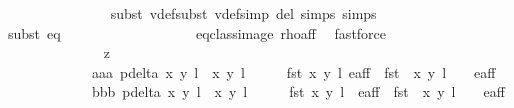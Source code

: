 \begin{isabellebody}
\ \ \ \ \ \ \ \ \ \ \ \ \ \ \isamarkupfalse%
{\isacharparenleft}subst\ v{}{\isacharunderscore}def{\isacharcomma}subst\ v{}{\isacharunderscore}def{\isacharcomma}simp\ del{\isacharcolon}\ {\isasymtau}{\isachardot}simps\ {\isasymrho}{\isachardot}simps{\isacharparenright}\isanewline
\ \ \ \ \ \ \ \ \ \ \ \ \ \ \isamarkupfalse%
{\isacharparenleft}subst\ eq{\isacharparenright}\ \ \ \isanewline
\ \ \ \ \ \ \ \ \ \ \ \ \ \ \isamarkupfalse%
\ eq{\isacharunderscore}class{\isacharunderscore}image\ rho{\isacharunderscore}aff\ \isamarkupfalse%
\ fastforce\isanewline
\ \ \ \ \ \ \ \ \ \ \isamarkupfalse%
\isanewline
\ \ \ \ \ \ \ \ \ \ \ \ \isamarkupfalse%
\ z{}\ \ \ \ \isanewline
\ \ \ \ \ \ \ \ \ \ \ \ \isamarkupfalse%
\isanewline
\ \ \ \ \ \ \ \ \ \ \ \ {\isacharparenleft}aaa{\isacharparenright}\ {\isachardoublequoteopen}p{\isacharunderscore}delta\ {\isacharparenleft}{\isacharparenleft}x{\isacharcomma}\ y{\isacharparenright}{\isacharcomma}\ l{\isacharparenright}\ {\isacharparenleft}{\isasymtau}\ {\isacharparenleft}x{\isacharprime}{\isacharcomma}\ y{\isacharprime}{\isacharparenright}{\isacharcomma}\ l{\isacharprime}\ {\isacharplus}\ {}{\isacharparenright}\ {\isasymnoteq}\ {}\ {\isasymand}\ fst\ {\isacharparenleft}{\isacharparenleft}x{\isacharcomma}\ y{\isacharparenright}{\isacharcomma}\ l{\isacharparenright}{\isasymin}\ e{\isacharunderscore}aff\ {\isasymand}\ fst\ {\isacharparenleft}{\isasymtau}\ {\isacharparenleft}x{\isacharprime}{\isacharcomma}\ y{\isacharprime}{\isacharparenright}{\isacharcomma}\ l{\isacharprime}\ {\isacharplus}\ {}{\isacharparenright}\ {\isasymin}\ e{\isacharunderscore}aff{\isachardoublequoteclose}\ {\isacharbar}\isanewline
\ \ \ \ \ \ \ \ \ \ \ \ {\isacharparenleft}bbb{\isacharparenright}\ {\isachardoublequoteopen}p{\isacharunderscore}delta{\isacharprime}\ {\isacharparenleft}{\isacharparenleft}x{\isacharcomma}\ y{\isacharparenright}{\isacharcomma}\ l{\isacharparenright}\ {\isacharparenleft}{\isasymtau}\ {\isacharparenleft}x{\isacharprime}{\isacharcomma}\ y{\isacharprime}{\isacharparenright}{\isacharcomma}\ l{\isacharprime}\ {\isacharplus}\ {}{\isacharparenright}\ {\isasymnoteq}\ {}\ {\isasymand}\ fst\ {\isacharparenleft}{\isacharparenleft}x{\isacharcomma}\ y{\isacharparenright}{\isacharcomma}\ l{\isacharparenright}\ {\isasymin}\ e{\isacharunderscore}aff\ {\isasymand}\ fst\ {\isacharparenleft}{\isasymtau}\ {\isacharparenleft}x{\isacharprime}{\isacharcomma}\ y{\isacharprime}{\isacharparenright}{\isacharcomma}\ l{\isacharprime}\ {\isacharplus}\ {}{\isacharparenright}\ {\isasymin}\ e{\isacharunderscore}aff{\isachardoublequoteclose}\ {\isacharbar}\isanewline

\end{isabellebody}
